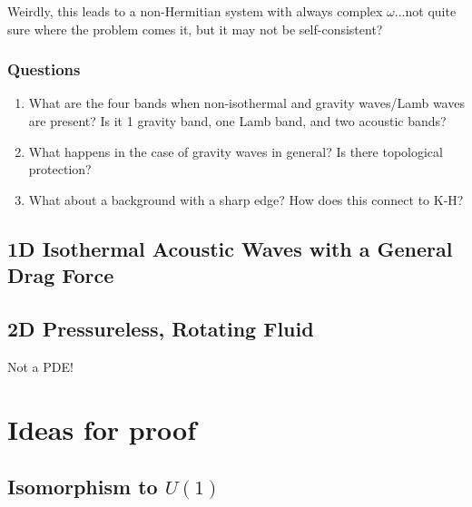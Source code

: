 \documentclass[11pt]{article}
\begin{document}
Weirdly, this leads to a non-Hermitian system with always complex $\omega$...not quite sure where the problem comes it, but it may not be self-consistent?


\subsubsection{Questions}
\label{sec:acoustic_questions}

\begin{enumerate}
\item What are the four bands when non-isothermal and gravity waves/Lamb waves are present? Is it 1 gravity band, one Lamb band, and two acoustic bands?
\item What happens in the case of gravity waves in general? Is there topological protection?
\item What about a background with a sharp edge? How does this connect to K-H?
\end{enumerate}

\subsection{1D Isothermal Acoustic Waves with a General Drag Force }
\label{sec:1D_acoustic_drag}



\subsection{2D Pressureless, Rotating Fluid }
\label{sec:1d_pressureless}

Not a PDE!

\section{Ideas for proof}
\label{sec:proof_ideas}

\subsection{Isomorphism to $U(1)$}
\label{sec:u1_iso}
\end{document}
